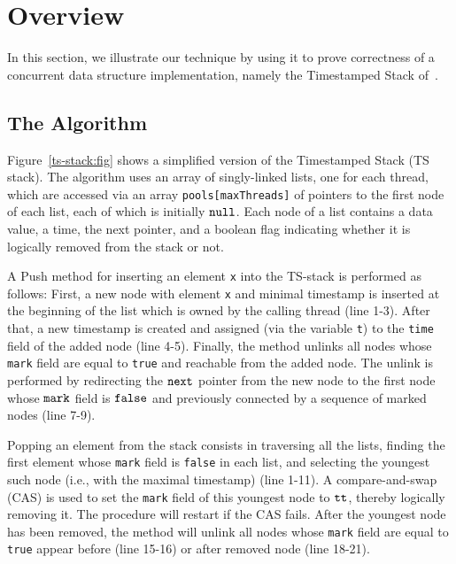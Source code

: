 \section{Overview}
\label{sec:overview}

In this section, we illustrate our technique by using it to prove correctness of
a concurrent data structure implementation, namely the Timestamped Stack
of~\cite{ts-stack}.

\subsection{The Algorithm}



Figure~\ref{ts-stack:fig} shows a simplified version of the Timestamped Stack (TS stack). The algorithm uses an array of singly-linked lists, one for each thread, which are accessed via an array {\tt pools[maxThreads]} of pointers to the first node of each list, each of which is initially ${\tt null}$. Each node of a list contains a data value, a time, the next pointer, and a boolean flag indicating whether it is logically removed from the stack or not.

A Push method for inserting an element {\tt x} into the TS-stack is performed as follows: First, a new node with element {\tt x} and minimal timestamp is inserted at the beginning of the list which is owned by the calling thread (line 1-3). After that, a new timestamp is created and assigned (via the variable {\tt t}) to the {\tt time} field of the added node (line 4-5).
 
Finally, the method unlinks all nodes whose {\tt mark} field are equal to {\tt true} and reachable from the added node. The unlink is performed by redirecting the $\tt next$ pointer from the new node to the first node whose $\tt mark$ field is $\tt false$ and previously connected by a sequence of marked nodes (line 7-9).

Popping an element from the stack consists in traversing all the lists, finding
the first element whose {\tt mark} field is {\tt false} in each
list, and selecting the youngest such node (i.e., with the maximal timestamp) (line 1-11).
A compare-and-swap (CAS) is used
to set the {\tt mark} field of this youngest node to ${\tt tt}$,
thereby logically removing it.
The procedure will restart if the CAS fails. After the youngest node has been removed, the method will unlink all nodes whose {\tt mark} field are equal to {\tt true} appear before (line 15-16) or after removed  node (line 18-21).
 

